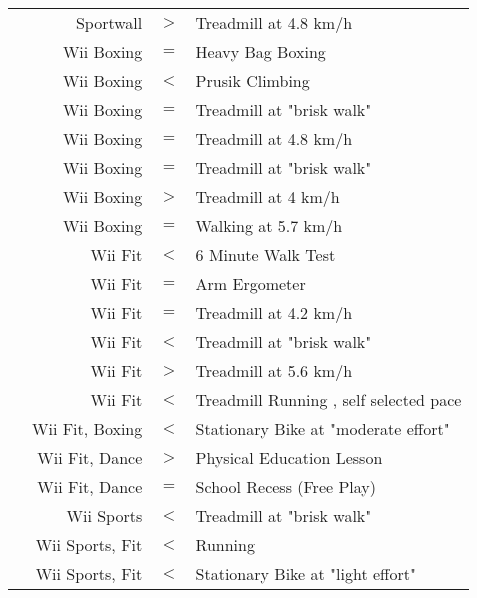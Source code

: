 {\begin{tabular}{lrcl}
\cite{Bailey2011EnergyExergaming}&Sportwall&\cellcolor{green!30}$>$&Treadmill at 4.8 km/h\\
\cite{Perusek2014AAdults}&Wii Boxing&\cellcolor{yellow!30}$=$&Heavy Bag Boxing\\
\cite{Sell2011EnergyActivities}&Wii Boxing&\cellcolor{red!30}$<$&Prusik Climbing\\
\cite{Willems2009ComparisonWalking}&Wii Boxing&\cellcolor{yellow!30}$=$&Treadmill at "brisk walk"\\
\cite{Bailey2011EnergyExergaming}&Wii Boxing&\cellcolor{yellow!30}$=$&Treadmill at 4.8 km/h\\
\cite{Sell2011EnergyActivities}&Wii Boxing&\cellcolor{yellow!30}$=$&Treadmill at "brisk walk"\\
\cite{Barkley2009PhysiologicAdults}&Wii Boxing&\cellcolor{green!30}$>$&Treadmill at 4 km/h\\
\cite{Graf2009PlayingChildren}&Wii Boxing&\cellcolor{yellow!30}$=$&Walking at 5.7 km/h\\
\cite{delCorral2014PhysiologicalCf}&Wii Fit&\cellcolor{red!30}$<$&6 Minute Walk Test\\
\cite{Chan2012InteractiveEfficacy}&Wii Fit&\cellcolor{yellow!30}$=$&Arm Ergometer\\
\cite{CebollaIMart2015AlternativeActivos}&Wii Fit&\cellcolor{yellow!30}$=$&Treadmill at 4.2 km/h\\
\cite{Graves2010TheAdults}&Wii Fit&\cellcolor{red!30}$<$&Treadmill at "brisk walk"\\
\cite{Douris2012ComparisonAdults}&Wii Fit&\cellcolor{green!30}$>$&Treadmill at 5.6 km/h\\
\cite{RoopchandMartin2016IsRunning}&Wii Fit&\cellcolor{red!30}$<$&Treadmill Running , self selected pace\\
\cite{Boese2014ESportsErgometertraining}&Wii Fit, Boxing&\cellcolor{red!30}$<$&Stationary Bike at "moderate effort"\\
\cite{Gao2015AExergaming}&Wii Fit, Dance&\cellcolor{green!30}$>$&Physical Education Lesson\\
\cite{Gao2015AExergaming}&Wii Fit, Dance&\cellcolor{yellow!30}$=$&School Recess (Free Play)\\
\cite{Willems2009ComparisonWalking}&Wii Sports&\cellcolor{red!30}$<$&Treadmill at "brisk walk"\\
\cite{White2011EnergyGames}&Wii Sports, Fit&\cellcolor{red!30}$<$&Running\\
\cite{Naugle2014CardiovascularTool}&Wii Sports, Fit&\cellcolor{red!30}$<$&Stationary Bike at "light effort"\\

\end{tabular}}
